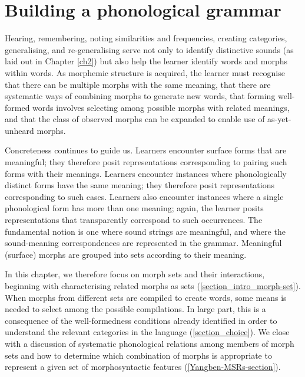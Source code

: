 \chapter{Building a phonological grammar} \label{chapter_grammar}
\label{Yangben_assessment_section}\label{ch3}

Hearing, remembering, noting similarities and frequencies, creating categories, generalising, and re-generalising serve not only to identify distinctive sounds (as laid out in Chapter \ref{ch2}) but also help the learner identify words and morphs within words. As morphemic structure is acquired, the learner must recognise that there can be multiple morphs with the same meaning, that there are systematic ways of combining morphs to generate new words, that forming well-formed words involves selecting among possible morphs with related meanings, and that the class of observed morphs can be expanded to enable use of as-yet-unheard morphs.

Concreteness continues to guide us. Learners encounter surface forms that are meaningful; they therefore posit representations corresponding to pairing such forms with their meanings. Learners encounter instances where phonologically distinct forms have the same meaning; they therefore posit representations corresponding to such cases. Learners also encounter instances where a single phonological form has more than one meaning; again, the learner posits representations that transparently correspond to such occurrences. The fundamental notion is one where sound strings are meaningful, and where the sound-meaning correspondences are represented in the grammar. Meaningful (surface) morphs are grouped into sets according to their meaning.

In this chapter, we therefore focus on morph sets and their interactions, beginning with characterising related morphs as sets (\Sec\ref{section_intro_morph-set}). When morphs from different sets are compiled to create words, some means is needed to select among the possible compilations. In large part, this is a consequence of the well-formedness conditions already  identified in order to understand the relevant categories in the language (\Sec\ref{section_choice}). We close with a discussion of systematic phonological relations among members of morph sets and how to determine which combination of morphs is appropriate to represent a given set of morphosyntactic features (\Sec\ref{Yangben-MSRs-section}).


